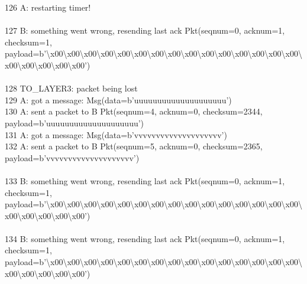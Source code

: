 \documentclass{article}
\begin{document}
{126 A: restarting timer! \\
 \\
127 B: something went wrong, resending last ack Pkt(seqnum=0, acknum=1,
checksum=1,
payload=b'\textbackslash{}x00\textbackslash{}x00\textbackslash{}x00\textbackslash{}x00\textbackslash{}x00\textbackslash{}x00\textbackslash{}x00\textbackslash{}x00\textbackslash{}x00\textbackslash{}x00\textbackslash{}x00\textbackslash{}x00\textbackslash{}x00\textbackslash{}x00\textbackslash{}x00\textbackslash{}x00\textbackslash{}x00\textbackslash{}x00\textbackslash{}x00\textbackslash{}x00')
\\
 \\
128     \hspace*{10mm}      TO\_LAYER3: packet being lost \\
129 A: got a message: Msg(data=b'uuuuuuuuuuuuuuuuuuuu') \\
130 A: sent a packet to B Pkt(seqnum=4, acknum=0, checksum=2344,
payload=b'uuuuuuuuuuuuuuuuuuuu') \\
131 A: got a message: Msg(data=b'vvvvvvvvvvvvvvvvvvvv') \\
132 A: sent a packet to B Pkt(seqnum=5, acknum=0, checksum=2365,
payload=b'vvvvvvvvvvvvvvvvvvvv') \\
 \\
133 B: something went wrong, resending last ack Pkt(seqnum=0, acknum=1,
checksum=1,
payload=b'\textbackslash{}x00\textbackslash{}x00\textbackslash{}x00\textbackslash{}x00\textbackslash{}x00\textbackslash{}x00\textbackslash{}x00\textbackslash{}x00\textbackslash{}x00\textbackslash{}x00\textbackslash{}x00\textbackslash{}x00\textbackslash{}x00\textbackslash{}x00\textbackslash{}x00\textbackslash{}x00\textbackslash{}x00\textbackslash{}x00\textbackslash{}x00\textbackslash{}x00')
\\
 \\
134 B: something went wrong, resending last ack Pkt(seqnum=0, acknum=1,
checksum=1,
payload=b'\textbackslash{}x00\textbackslash{}x00\textbackslash{}x00\textbackslash{}x00\textbackslash{}x00\textbackslash{}x00\textbackslash{}x00\textbackslash{}x00\textbackslash{}x00\textbackslash{}x00\textbackslash{}x00\textbackslash{}x00\textbackslash{}x00\textbackslash{}x00\textbackslash{}x00\textbackslash{}x00\textbackslash{}x00\textbackslash{}x00\textbackslash{}x00\textbackslash{}x00')
\\
 \\
}
\end{document}
